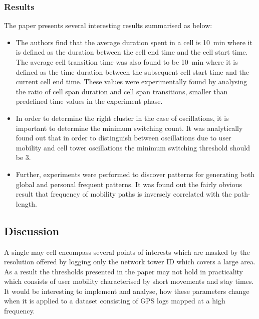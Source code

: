 \subsubsection*{Results}
The paper presents several interesting results summarised as below:

\begin{itemize}

	\item The authors find that the average duration spent in a cell is 10~min where it is 
	defined as the duration between the cell end time and the cell start time. The average
	cell transition time was also found to be 10~min where it is defined as the time duration
	between the subsequent cell start time and the current cell end time. These values were 
	experimentally found by analysing the ratio of cell span duration and cell span transitions,
	smaller than predefined time values in the experiment phase.  
	
	\item In order to determine the right cluster in the case of oscillations, it is important
	to determine the minimum switching count. It was analytically found out that in order to 
	distinguish between oscillations due to user mobility and cell tower oscillations the 
	minimum switching threshold should be 3. 
	
	\item Further, experiments were performed to discover patterns for generating both global
	and personal frequent patterns. It was found out the fairly obvious result that frequency 
	of mobility paths is inversely correlated with the path-length. 
	
\end{itemize}

\subsection*{Discussion}
A single may cell encompass several points of interests which are masked by the resolution 
offered by logging only the network tower ID which covers a large area. As a result the thresholds 
presented in the paper may not hold in practicality which consists of user mobility characterised 
by short movements and stay times. It would be interesting to implement and analyse, how these
parameters change when it is applied to a dataset consisting of GPS logs mapped at a high
frequency. 
